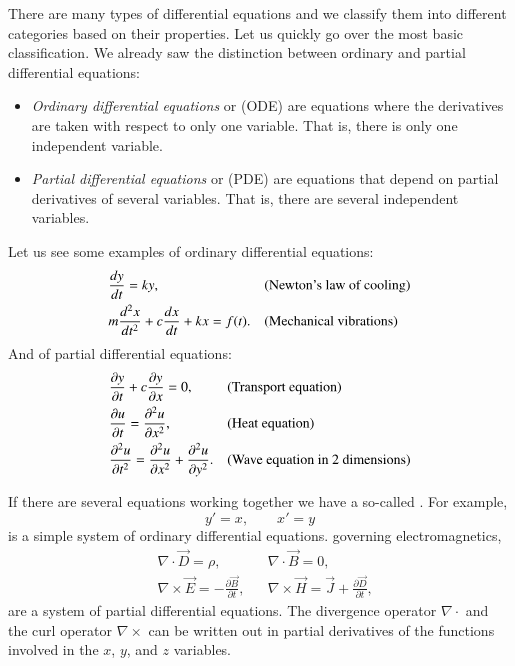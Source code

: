 \documentclass[12pt]{book}
\begin{document}
There are many types of differential equations and we classify them into
different categories based on their properties.  Let us quickly go over
the most basic classification.  We already saw the distinction
between ordinary and partial differential equations:
\begin{itemize}
\item
\emph{Ordinary differential equations}
 or (ODE) are
equations where the derivatives are taken with respect to only one variable.
That is, there is only one independent variable.
\item
\emph{Partial differential equations}
 or (PDE) are
equations that depend on partial derivatives of several variables.
That is, there are several independent variables.
\end{itemize}

Let us see some examples of ordinary differential equations:
\begin{align*}
& \frac{d y}{dt} = ky , & & \text{(\myindex{Newton's law of cooling})} \\
& m \frac{d^2 x}{dt^2} + c \frac{dx}{dt} + kx = f(t) . & &
\text{(\myindex{Mechanical vibrations})}
\end{align*}
And of partial differential equations:
\begin{align*}
& \frac{\partial y}{\partial t} + c \frac{\partial y}{\partial x} = 0 , & & 
\text{(\myindex{Transport equation})} \\
& \frac{\partial u}{\partial t} = \frac{\partial^2 u}{\partial x^2} , & & 
\text{(\myindex{Heat equation})} \\
& \frac{\partial^2 u}{\partial t^2} = \frac{\partial^2 u}{\partial x^2} +
\frac{\partial^2 u}{\partial y^2} . & & 
\text{(\myindex{Wave equation in 2 dimensions})}
\end{align*}

If there are several equations working together we have a so-called
\emph{}.  For example,
\begin{equation*}
y' = x , \qquad x' = y
\end{equation*}
is a simple system of ordinary differential equations.
 governing electromagnetics,
\begin{align*}
& \nabla \cdot \vec{D} = \rho, & & \nabla \cdot \vec{B} = 0 , \\
& \nabla \times \vec{E} = - \frac{\partial \vec{B}}{\partial t}, &
& \nabla \times \vec{H} = \vec{J} + \frac{\partial \vec{D}}{\partial t} ,
\end{align*}
are a system of partial differential equations. 
The divergence operator $\nabla \cdot$ and the
curl operator $\nabla \times$ can be written out in partial derivatives of
the functions involved in the $x$, $y$, and $z$ variables.
\end{document}
